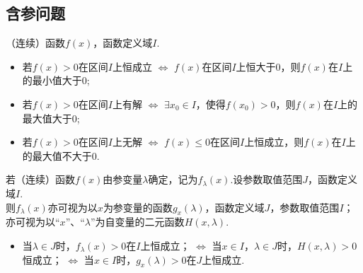   \subsection{含参问题}
  \begin{description}
    \item （连续）函数$f(x)$，函数定义域$I$.
      \begin{itemize}[leftmargin=*]
        \item 若$f(x)>0$在区间$I$上恒成立 $\Leftrightarrow$ $f(x)$在区间$I$上恒大于0，则$f(x)$在$I$上的最小值大于0;
        \item 若$f(x)>0$在区间$I$上有解 $\Leftrightarrow$ $\exists x_0\in I$，使得$f(x_0)>0$，则$f(x)$在$I$上的最大值大于0;
        \item 若$f(x)>0$在区间$I$上无解 $\Leftrightarrow$ $f(x)\leqslant 0$在区间$I$上恒成立，则$f(x)$在$I$上的最大值不大于0.
      \end{itemize}
    \item  若（连续）函数$f(x)$由参变量$\lambda$确定，记为$f_\lambda(x)$.设参数取值范围$J$，函数定义域$I$.\\
      则$f_\lambda(x)$亦可视为以$x$为参变量的函数$g_x(\lambda)$，函数定义域$J$，参数取值范围$I$；\\
      亦可视为以“$x$”、“$\lambda$”为自变量的二元函数$H(x,\lambda)$.
      \begin{itemize}[leftmargin=*]
        \item 当$\lambda\in J$时，$f_\lambda(x)>0$在$I$上恒成立；
              $\Leftrightarrow$ 当$x\in I$，$\lambda\in J$时，$H(x,\lambda)>0$恒成立；
              $\Leftrightarrow$ 当$x\in I$时，$g_x(\lambda)>0$在$J$上恒成立.
      \end{itemize}
  \end{description}

